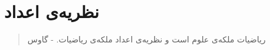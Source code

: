 \chapter{نظریه‌ی اعداد}
\thispagestyle{empty}

\begin{quote}
	{\lotus
		ریاضیات ملکه‌ی علوم است و نظریه‌ی اعداد ملکه‌ی ریاضیات. \quad - گاوس%
	}
\end{quote}
